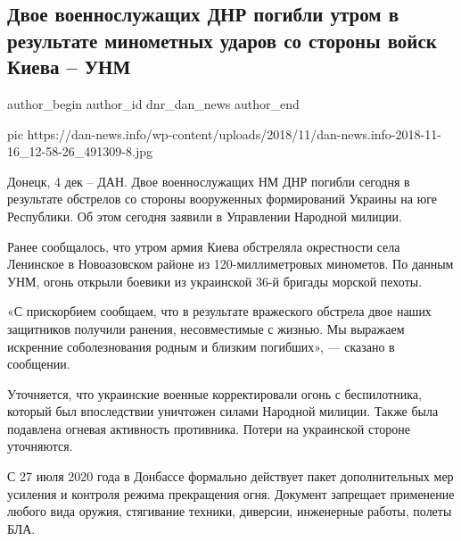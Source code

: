  
 
 
 
 
 
\subsection{Двое военнослужащих ДНР погибли утром в результате минометных ударов со стороны войск Киева – УНМ}
\label{sec:04_12_2020.news.dnr.dan.dnr_dan_news.1.dvoje_voinov_pogibli_unm}
\ifcmt
	author_begin
   author_id dnr_dan_news
	author_end
\fi

\ifcmt
pic https://dan-news.info/wp-content/uploads/2018/11/dan-news.info-2018-11-16_12-58-26_491309-8.jpg
\fi

Донецк, 4 дек – ДАН. Двое военнослужащих НМ ДНР погибли сегодня в результате
обстрелов со стороны вооруженных формирований Украины на юге Республики. Об
этом сегодня заявили в Управлении Народной милиции.

Ранее сообщалось, что утром армия Киева обстреляла окрестности села Ленинское в
Новоазовском районе из 120-миллиметровых минометов. По данным УНМ, огонь
открыли боевики из украинской 36-й бригады морской пехоты.

«С прискорбием сообщаем, что в результате вражеского обстрела двое наших
защитников получили ранения, несовместимые с жизнью. Мы выражаем искренние
соболезнования родным и близким погибших», — сказано в сообщении.

Уточняется, что украинские военные корректировали огонь с беспилотника, который
был впоследствии уничтожен силами Народной милиции. Также была подавлена
огневая активность противника. Потери на украинской стороне уточняются.

С 27 июля 2020 года в Донбассе формально действует пакет дополнительных мер
усиления и контроля режима прекращения огня. Документ запрещает применение
любого вида оружия, стягивание техники, диверсии, инженерные работы, полеты
БЛА.
